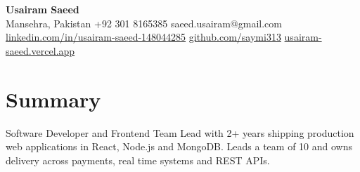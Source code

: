 \documentclass[11pt,letterpaper]{article}
\begin{document}
\begin{center}
  {\fontsize{17}{20}\selectfont\bfseries Usairam Saeed}\\[0.3em]
  {\small Mansehra, Pakistan \textbar{} +92 301 8165385 \textbar{} saeed.usairam@gmail.com \textbar{} \href{https://www.linkedin.com/in/usairam-saeed-148044285/}{linkedin.com/in/usairam-saeed-148044285} \textbar{} \href{https://github.com/saymi313}{github.com/saymi313} \textbar{} \href{https://usairam-saeed.vercel.app/}{usairam-saeed.vercel.app}}
\end{center}


\section{Summary}
Software Developer and Frontend Team Lead with 2+ years shipping production web applications in React, Node.js and MongoDB. Leads a team of 10 and owns delivery across payments, real time systems and REST APIs.
\end{document}
